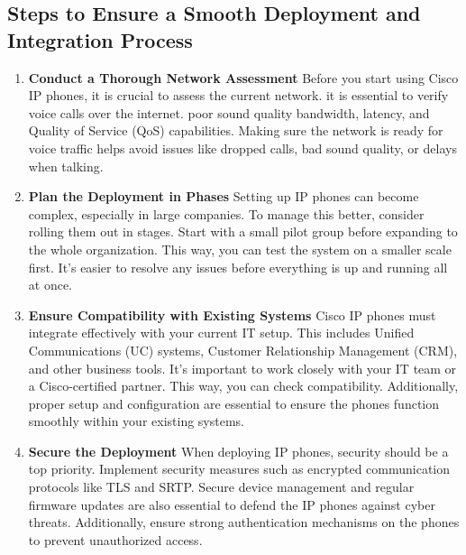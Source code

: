 \documentclass[11pt,a4paper]{article}
\begin{document}
\subsection*{Steps to Ensure a Smooth Deployment and Integration Process}
\begin{enumerate}
  \item \textbf{Conduct a Thorough Network Assessment}
  Before you start using Cisco IP phones, it is crucial to assess the current network. it is essential to verify voice calls over the internet. poor sound quality bandwidth, latency, and Quality of Service (QoS) capabilities. Making sure the network is ready for voice traffic helps avoid issues like dropped calls, bad sound quality, or delays when talking.
  \item \textbf{Plan the Deployment in Phases}
  Setting up IP phones can become complex, especially in large companies. To manage this better, consider rolling them out in stages. Start with a small pilot group before expanding to the whole organization. This way, you can test the system on a smaller scale first. It’s easier to resolve any issues before everything is up and running all at once.
  \item \textbf{Ensure Compatibility with Existing Systems}
  Cisco IP phones must integrate effectively with your current IT setup. This includes Unified Communications (UC) systems, Customer Relationship Management (CRM), and other business tools. It's important to work closely with your IT team or a Cisco-certified partner. This way, you can check compatibility. Additionally, proper setup and configuration are essential to ensure the phones function smoothly within your existing systems.
  \item \textbf{Secure the Deployment}
  When deploying IP phones, security should be a top priority. Implement security measures such as encrypted communication protocols like TLS and SRTP. Secure device management and regular firmware updates are also essential to defend the IP phones against cyber threats. Additionally, ensure strong authentication mechanisms on the phones to prevent unauthorized access.

\end{enumerate}
\end{document}
